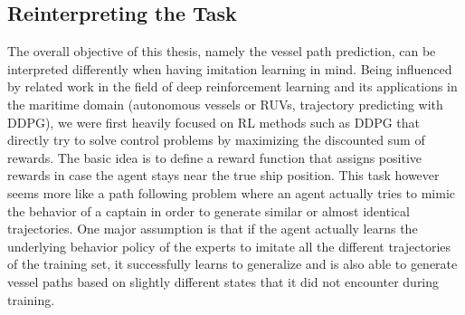 \subsection{Reinterpreting the Task} \label{subchap:reinterpreting}
The overall objective of this thesis, namely the vessel path prediction, can be interpreted differently when having imitation learning in mind. Being influenced by related work in the field of deep reinforcement learning and its applications in the maritime domain (autonomous vessels or RUVs, trajectory predicting with DDPG), we were first heavily focused on RL methods such as DDPG that directly try to solve control problems by maximizing the discounted sum of rewards. The basic idea is to define a reward function that assigns positive rewards in case the agent stays near the true ship position. This task however seems more like a path following problem where an agent actually tries to mimic the behavior of a captain in order to generate similar or almost identical trajectories. One major assumption is that if the agent actually learns the underlying behavior policy of the experts to imitate all the different trajectories of the training set, it successfully learns to generalize and is also able to generate vessel paths based on slightly different states that it did not encounter during training.